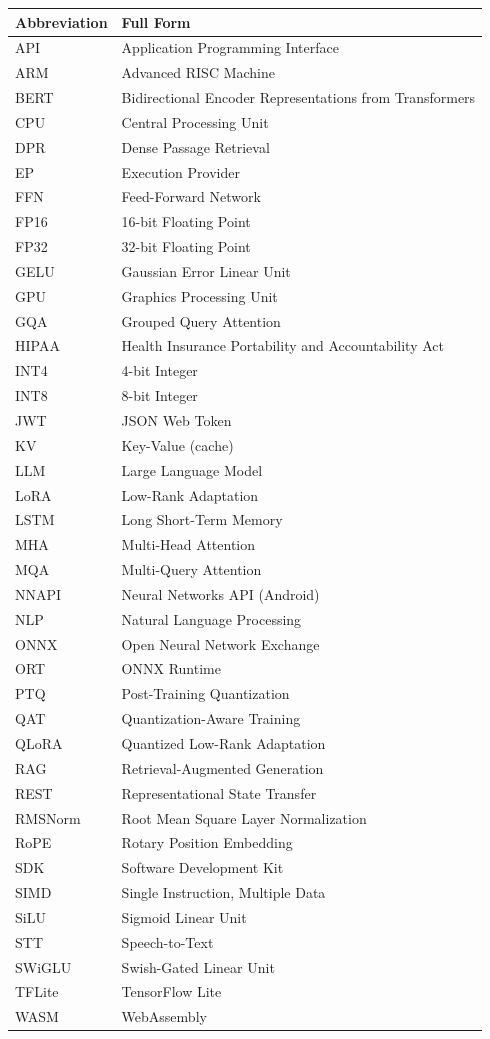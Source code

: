 \documentclass[12pt, letterpaper, twoside]{report}
\begin{document}
\begin{longtable}{@{}ll@{}}
\toprule
\textbf{Abbreviation} & \textbf{Full Form} \\
\midrule
\endhead
API    & Application Programming Interface \\
ARM    & Advanced RISC Machine \\
BERT   & Bidirectional Encoder Representations from Transformers \\
CPU    & Central Processing Unit \\
DPR    & Dense Passage Retrieval \\
EP     & Execution Provider \\
FFN    & Feed-Forward Network \\
FP16   & 16-bit Floating Point \\
FP32   & 32-bit Floating Point \\
GELU   & Gaussian Error Linear Unit \\
GPU    & Graphics Processing Unit \\
GQA    & Grouped Query Attention \\
HIPAA  & Health Insurance Portability and Accountability Act \\
INT4   & 4-bit Integer \\
INT8   & 8-bit Integer \\
JWT    & JSON Web Token \\
KV     & Key-Value (cache) \\
LLM    & Large Language Model \\
LoRA   & Low-Rank Adaptation \\
LSTM   & Long Short-Term Memory \\
MHA    & Multi-Head Attention \\
MQA    & Multi-Query Attention \\
NNAPI  & Neural Networks API (Android) \\
NLP    & Natural Language Processing \\
ONNX   & Open Neural Network Exchange \\
ORT    & ONNX Runtime \\
PTQ    & Post-Training Quantization \\
QAT    & Quantization-Aware Training \\
QLoRA  & Quantized Low-Rank Adaptation \\
RAG    & Retrieval-Augmented Generation \\
REST   & Representational State Transfer \\
RMSNorm & Root Mean Square Layer Normalization \\
RoPE   & Rotary Position Embedding \\
SDK    & Software Development Kit \\
SIMD   & Single Instruction, Multiple Data \\
SiLU   & Sigmoid Linear Unit \\
STT    & Speech-to-Text \\
SWiGLU & Swish-Gated Linear Unit \\
TFLite & TensorFlow Lite \\
WASM   & WebAssembly \\
\bottomrule
\end{longtable}
\end{document}
